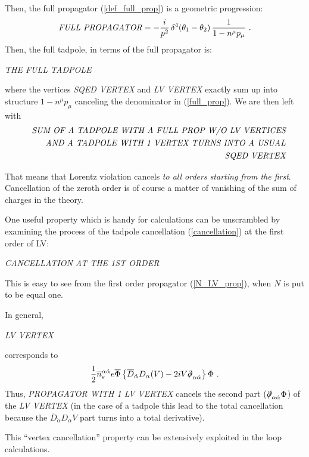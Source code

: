 \documentclass[a4paper,12pt]{article}
\newcommand{\slashed}[1]{\hbox{{$#1$}\llap{$/$}}}
\begin{document}
	Then, the full propagator (\ref{def_full_prop}) is a 
	geometric progression: 
\begin{equation}
\label{full_prop}
	\emph{FULL PROPAGATOR} = - \frac{i}{p^2}\,
		\delta^4 (\theta_1 - \theta_2)\,
		\frac{1}
	           {1 - n^\mu p_\mu}
	~.
\end{equation}
	Then, the full tadpole, in terms of the full propagator is:

\emph{THE FULL TADPOLE}

	where the vertices
\emph{SQED VERTEX}
	and
\emph{LV VERTEX}
	exactly sum up into structure 
$ 1 - n^\mu p_\mu $
	canceling the denominator in (\ref{full_prop}).
	We are then left with
\begin{eqnarray}
\nonumber
&& \emph{SUM OF A TADPOLE WITH A FULL PROP W/O LV VERTICES} \\
\label{cancellation}
&& \emph{AND A TADPOLE WITH 1 VERTEX TURNS INTO A USUAL} \\
\nonumber
&& \emph{SQED VERTEX}
\end{eqnarray}

	That means that Lorentz violation cancels
	{\it to all orders starting from the first}.
	Cancellation of the zeroth order is of course
	a matter of vanishing of the sum of charges 
	in the theory.

	One useful property which is handy for calculations
	can be unscrambled by examining the process of the
	tadpole cancellation (\ref{cancellation}) at the first 
	order of LV:

\emph{CANCELLATION AT THE 1ST ORDER}

	This is easy to see from the first order propagator
	(\ref{N_LV_prop}), when $ N $ is put to be equal one.

	In general, 

\emph{LV VERTEX}
	
	corresponds to
\[
	\frac{1}{2} \overline{n}_e^{\alpha\dot\alpha}
	e \overline{\Phi}
	\left\{
		\overline{D}_{\dot\alpha} D_\alpha ( V )
		- 
		2 i V \slashed{\partial}_{\alpha\dot\alpha}
	\right\} \Phi
	~.
\] 
	Thus, 
\emph{PROPAGATOR WITH 1 LV VERTEX}
	cancels the second part
	($ \slashed{\partial}_{\alpha\dot\alpha} \Phi $)
	of the
\emph{LV VERTEX}
	(in the case of a tadpole this lead to the total 
	cancellation because the 
	$ \overline{D}_{\dot\alpha} D_\alpha V $
	part turns into a total derivative).

	This ``vertex cancellation'' property can be extensively
	exploited in the loop calculations.
\end{document}
